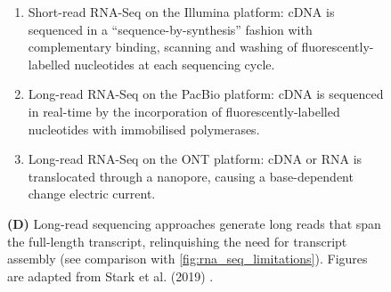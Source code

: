 \begin{figure}[htp]
{\begin{enumerate}[label=\textbf{(\Alph*)}]
			\item Short-read RNA-Seq on the Illumina platform: cDNA is sequenced in a “sequence-by-synthesis” fashion with complementary binding, scanning and washing of fluorescently-labelled nucleotides at each sequencing cycle.
			\item Long-read RNA-Seq on the PacBio platform: cDNA is sequenced in real-time by the incorporation of fluorescently-labelled nucleotides with immobilised polymerases.
			\item Long-read RNA-Seq on the ONT platform: cDNA or RNA is translocated through a nanopore, causing a base-dependent change electric current.
			\\
		\end{enumerate}
		\textbf{(D)} Long-read sequencing approaches generate long reads that span the full-length transcript, relinquishing the need for transcript assembly (see comparison with \cref{fig:rna_seq_limitations}). \newline
		Figures are adapted from Stark et al. (2019) \cite{Stark2019}.
	} 
	\label{fig:longread_benefits}
\end{figure}	

